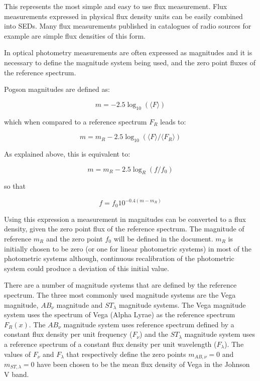 \documentclass[11pt,a4paper]{ivoa}
\begin{document}
This represents the most simple and easy to use flux measurement. Flux
measurements expressed in physical flux density units can be easily combined
into SEDs. Many flux measurements published in catalogues of radio sources
for example are simple flux densities of this form.
\par

In optical photometry measurements are often expressed as magnitudes and it
is necessary to define the magnitude system being used, and the zero point
fluxes of the reference spectrum.
\par

Pogson magnitudes are defined as:

\begin{equation} \label{eq:4}
m = -2.5\log_{10} (\langle F\rangle )
\end{equation}

which when compared to a reference spectrum $F_R$ leads to:

\begin{equation} \label{eq:5}
m = m_R -2.5 \log_{10} \left(\langle F\rangle /\langle F_R \rangle \right)
\end{equation}

As explained above, this is equivalent to:

\begin{equation} \label{eq:6}
m = m_R - 2.5 \log_{R} (f/f_0 )
\end{equation}


so that

\begin{equation} \label{eq:7}
f = f_0 10^{-0.4(m - m_{R})}
\end{equation}


Using this expression a measurement in magnitudes can be converted to a
flux density, given the zero point flux of the reference spectrum.  The
magnitude of reference $m_{R}$ and the zero point $f_0$ will be defined
in the document. $m_{R}$ is initially chosen to be zero (or one for
linear photometric systems) in most of the photometric systems although,
continuous recalibration of the photometric system could
produce a deviation of this initial value.
\par

There are a number of magnitude systems that are defined by the reference
spectrum. The three most commonly used magnitude systems are the Vega
magnitude, $AB_{\nu }$ magnitude and $ST_{\lambda }$ magnitude systems.
The Vega magnitude system uses the spectrum of Vega (Alpha Lyrae) as the
reference spectrum $F_R (x)$. The $AB_{\nu }$ magnitude system uses
reference spectrum defined by a constant flux density per unit frequency
($F_{\nu }$) and the
$ST_{\lambda }$ magnitude system uses a reference spectrum of a constant
flux density per unit wavelength ($F_{\lambda }$). The values of $F_{\nu }$
and $F_{\lambda }$ that respectively define the zero points
$m_{AB,\nu } =0$ and
$m_{ST,\lambda } =0$ have been chosen to be the mean flux density of
Vega in the Johnson V band.
\end{document}
